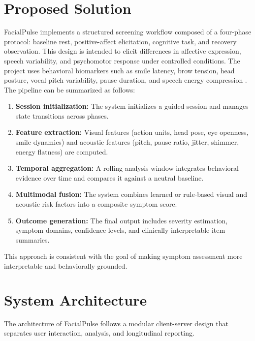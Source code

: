 \documentclass[conference, 12pt]{IEEEtran}
\begin{document}
\section{Proposed Solution}
FacialPulse implements a structured screening workflow composed of a four-phase protocol: baseline rest, positive-affect elicitation, cognitive task, and recovery observation. This design is intended to elicit differences in affective expression, speech variability, and psychomotor response under controlled conditions. The project uses behavioral biomarkers such as smile latency, brow tension, head posture, vocal pitch variability, pause duration, and speech energy compression \cite{ref2, ref4}. The pipeline can be summarized as follows:
\begin{enumerate}[leftmargin=1.5em]
    \item \textbf{Session initialization:} The system initializes a guided session and manages state transitions across phases.
    \item \textbf{Feature extraction:} Visual features (action units, head pose, eye openness, smile dynamics) \cite{ref4} and acoustic features (pitch, pause ratio, jitter, shimmer, energy flatness) \cite{ref2} are computed.
    \item \textbf{Temporal aggregation:} A rolling analysis window integrates behavioral evidence over time and compares it against a neutral baseline.
    \item \textbf{Multimodal fusion:} The system combines learned or rule-based visual and acoustic risk factors into a composite symptom score.
    \item \textbf{Outcome generation:} The final output includes severity estimation, symptom domains, confidence levels, and clinically interpretable item summaries.
\end{enumerate}
This approach is consistent with the goal of making symptom assessment more interpretable and behaviorally grounded.

\section{System Architecture}
The architecture of FacialPulse follows a modular client-server design that separates user interaction, analysis, and longitudinal reporting.
\end{document}
